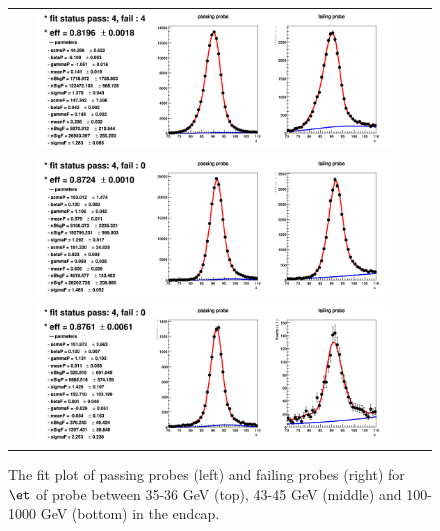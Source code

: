 \begin{figure}[bh]
  \begin{center}
    \begin{tabular}{cc}
      \includegraphics[width=0.9\textwidth]{figures/Zprime/2017/ScaleFactor/Fit_method/Run2017BCDEF_endcap_Et_DYToEE_amc/passingHEEP/plots/data_Run2017B/nominalFit/bin00_p_eta_abs_1p57To2p50_p_Et_35p00To36p00.png} \\
      \includegraphics[width=0.9\textwidth]{figures/Zprime/2017/ScaleFactor/Fit_method/Run2017BCDEF_endcap_Et_DYToEE_amc/passingHEEP/plots/data_Run2017B/nominalFit/bin08_p_eta_abs_1p57To2p50_p_Et_43p00To45p00.png} \\
      \includegraphics[width=0.9\textwidth]{figures/Zprime/2017/ScaleFactor/Fit_method/Run2017BCDEF_endcap_Et_DYToEE_amc/passingHEEP/plots/data_Run2017B/nominalFit/bin16_p_eta_abs_1p57To2p50_p_Et_100p00To1000p00.png} \\
    \end{tabular}
    \caption{The fit plot of passing probes (left) and failing probes (right) for $\et$ of probe between 35-36 GeV (top), 43-45 GeV (middle) and 100-1000 GeV (bottom) in the endcap.}
    \label{fig:fit_probe_endcap}
  \end{center}
\end{figure}


